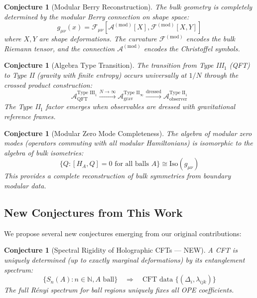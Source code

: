 \documentclass[12pt,a4paper]{article}
\newtheorem{conjecture}[theorem]{Conjecture}
\begin{document}
\begin{conjecture}[Modular Berry Reconstruction]
The bulk geometry is completely determined by the modular Berry connection on shape space:
\begin{equation}
g_{\mu\nu}(x) = \mathcal{F}_{\mu\nu}\left[ \mathcal{A}^{(\text{mod})}[X], \mathcal{F}^{(\text{mod})}[X,Y] \right]
\end{equation}
where $X, Y$ are shape deformations. The curvature $\mathcal{F}^{(\text{mod})}$ encodes the bulk Riemann tensor, and the connection $\mathcal{A}^{(\text{mod})}$ encodes the Christoffel symbols.
\end{conjecture}

\begin{conjecture}[Algebra Type Transition]
The transition from Type III$_1$ (QFT) to Type II (gravity with finite entropy) occurs universally at $1/N$ through the crossed product construction:
\begin{equation}
\mathcal{A}_{\text{QFT}}^{\text{Type III}_1} \xrightarrow{N \to \infty} \mathcal{A}_{\text{grav}}^{\text{Type II}_\infty} \xrightarrow{\text{dressed}} \mathcal{A}_{\text{observer}}^{\text{Type II}_1}
\end{equation}
The Type II$_1$ factor emerges when observables are dressed with gravitational reference frames.
\end{conjecture}

\begin{conjecture}[Modular Zero Mode Completeness]
The algebra of modular zero modes (operators commuting with all modular Hamiltonians) is isomorphic to the algebra of bulk isometries:
\begin{equation}
\{ Q : [H_A, Q] = 0 \text{ for all balls } A \} \cong \text{Iso}(g_{\mu\nu})
\end{equation}
This provides a complete reconstruction of bulk symmetries from boundary modular data.
\end{conjecture}

\subsection{New Conjectures from This Work}

We propose several new conjectures emerging from our original contributions:

\begin{conjecture}[Spectral Rigidity of Holographic CFTs --- NEW]
A CFT is uniquely determined (up to exactly marginal deformations) by its entanglement spectrum:
\begin{equation}
\{S_n(A) : n \in \mathbb{N}, A \text{ ball}\} \quad \Rightarrow \quad \text{CFT data } \{(\Delta_i, \lambda_{ijk})\}
\end{equation}
The full R\'enyi spectrum for ball regions uniquely fixes all OPE coefficients.
\end{conjecture}
\end{document}

